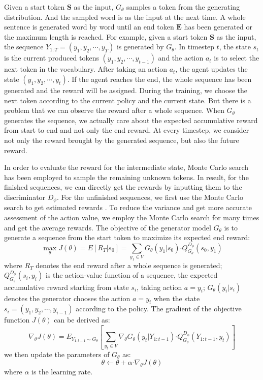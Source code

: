 \documentclass{llncs}
\begin{document}
Given a start token $ \textbf{S}$ as the input, $G_{\theta}$ samples a token from the generating distribution. And the sampled word is as the input at the next time. A whole sentence is generated word by word until an end token $\textbf{E}$ has been generated or the maximum length is reached.
For example, given a start token $\textbf{S}$ as the input, the sequence $Y_{1:T} = (y_{1},y_{2},\cdots,y_{T})$ is generated by $G_{\theta}$. In timestep $t$, the state $s_{t}$ is the current produced tokens $(y_{1},y_{2},\cdots,y_{t-1})$ and the action $a_{t}$ is to select the next token in the vocabulary.  After taking an action $a_{t}$, the agent updates the state $ (y_{1},y_{2},\cdots,y_{t})$. If the agent reaches the end,  the whole sequence has been generated and the reward will be assigned. During the training, we choose the next token according to the current policy and the current state. But there is a problem that we can observe the reward after a whole sequence. When $G_{\theta}$ generates the sequence, we actually care about the expected accumulative reward from start to end and not only the end reward. At every timestep, we consider not only the reward brought by the generated sequence, but also the future reward.


 In order to evaluate the reward for the intermediate state, Monte Carlo search has been employed to sample the remaining unknown tokens. In result, for the finished sequences, we can directly get the rewards by inputting them to the discriminator $D_{\phi}$. For the unfinished sequences, we first use the Monte Carlo search to get estimated rewards \cite{chaslot2008monte-carlo}. To reduce the variance and get more accurate assessment of the action value, we employ the Monte Carlo search for many times and get the average rewards. The objective of the generator model $G_{\theta}$ is to generate a sequence from the start token to maximize its expected end reward:
\begin{equation}
\max_{\theta} J(\theta) = E[R_{T}| s_{0}] = \sum_{y_1 \in V} G_{\theta}(y_1|s_0) \bm\cdot Q_{G_\theta}^{D_\phi}(s_0,y_1)
\label{eq:pathnode}
\end{equation}
where $R_{T}$ denotes the end reward after a whole sequence is generated; $Q_{G_\theta}^{D_\phi}(s_i,y_i)$ is the action-value function of a sequence, the expected accumulative reward starting from state $s_{i}$, taking action $a=y_{i}$; $G_{\theta}(y_{i}|s_{i})$ denotes the generator chooses the action $a=y_{i}$ when the state $s_{i}=(y_{1},y_{2},\cdots,y_{i-1})$ according to the policy. The gradient of the objective function $J(\theta)$ can be derived \cite{yu2016seqgan:} as:
\begin{equation}
\nabla_{\theta} J(\theta) = E_{Y_{1:t-1}\sim G_{\theta}} \left [\sum_{y_t \in V}  \nabla_{\theta }G_{\theta}(y_t|Y_{1:t-1}) \bm\cdot Q_{G_\theta}^{D_\phi}(Y_{1:t-1},y_t) \right ]
\label{eq:pathnode}
\end{equation}
we then update the parameters of $G_{\theta}$ as:
\begin{equation}
\theta \leftarrow \theta + \alpha \bm\cdot \nabla_{\theta} J(\theta) 
\label{eq:pathnode}
\end{equation}
where $\alpha$ is the learning rate.
\end{document}
